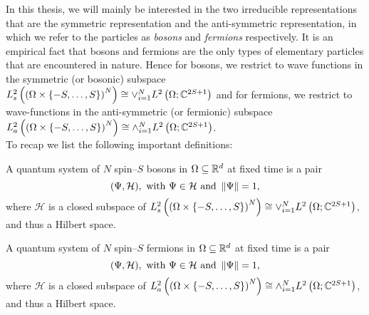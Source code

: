 		In this thesis, we will mainly be interested in the two irreducible representations that are the symmetric representation and the anti-symmetric representation, in which we refer to the particles as \emph{bosons} and \emph{fermions} respectively. It is an empirical fact that bosons and fermions are the only types of elementary particles that are encountered in nature. Hence for bosons, we restrict to wave functions in the symmetric (or bosonic) subspace $ L^2_{s}\left(\left(\Omega\times \{-S,\ldots,S\}\right)^N \right)\cong\vee_{i=1}^{N}L^2\left(\Omega; \mathbb{C}^{2S+1}\right)$ and for fermions, we restrict to wave-functions in the anti-symmetric (or fermionic) subspace $ L^2_{a}\left(\left(\Omega\times \{-S,\ldots,S\}\right)^N \right)\cong\wedge_{i=1}^{N}L^2\left(\Omega; \mathbb{C}^{2S+1}\right)$.\\
		To recap we list the following important definitions:
		\begin{definition}
			A quantum system of $N$ spin--$ S $ bosons in $ \Omega\subseteq\mathbb{R}^d $ at fixed time is a pair
			\begin{equation*}
			(\Psi,\mathcal{H}),\text{ with } \Psi\in\mathcal{H}\text{ and }\left\lVert \Psi \right\rVert=1,
			\end{equation*}
			where $ \mathcal{H} $ is a closed subspace of $ L^2_{s}\left(\left(\Omega\times \{-S,\ldots,S\}\right)^N \right)\cong\vee_{i=1}^{N}L^2\left(\Omega; \mathbb{C}^{2S+1}\right) $, and thus a Hilbert space.
		\end{definition}
		\begin{definition}
			A quantum system of $N$ spin--$ S $ fermions in $ \Omega\subseteq\mathbb{R}^d $ at fixed time is a pair
			\begin{equation*}
			(\Psi,\mathcal{H}),\text{ with } \Psi\in\mathcal{H}\text{ and }\left\lVert \Psi \right\rVert=1,
			\end{equation*}
			where $ \mathcal{H} $ is a closed subspace of $ L^2_{a}\left(\left(\Omega\times \{-S,\ldots,S\}\right)^N \right)\cong\wedge_{i=1}^{N}L^2\left(\Omega; \mathbb{C}^{2S+1}\right) $, and thus a Hilbert space.
		\end{definition}
	
